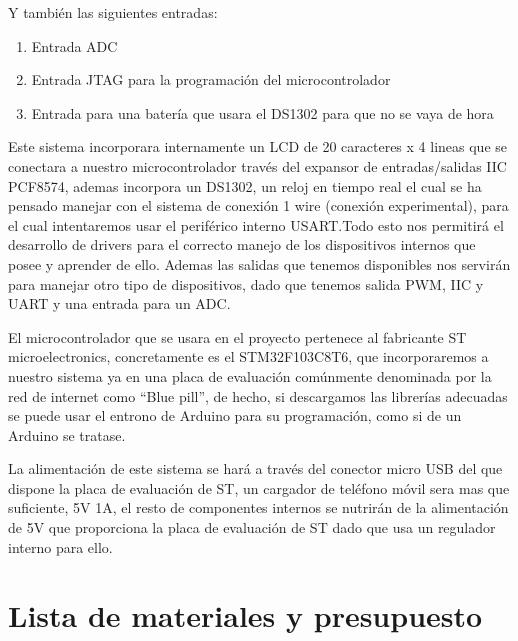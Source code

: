 \documentclass[10pt,a4paper,oneside]{article}
\begin{document}
Y también las siguientes entradas:

\begin{enumerate}
	\item Entrada ADC
	\item Entrada JTAG para la programación del microcontrolador
	\item Entrada para una batería que usara el DS1302 para que no se vaya de hora
\end{enumerate}

Este sistema incorporara internamente un LCD de 20 caracteres x 4 lineas que se conectara a nuestro microcontrolador través del expansor de entradas/salidas IIC PCF8574, ademas incorpora un DS1302, un reloj en tiempo real el cual se ha pensado manejar con el sistema de conexión 1 wire (conexión experimental), para el cual intentaremos usar el periférico interno USART.Todo esto nos permitirá el desarrollo de drivers para el correcto manejo de los dispositivos internos que posee y aprender de ello. Ademas las salidas que tenemos disponibles nos servirán para manejar otro tipo de dispositivos, dado que tenemos salida PWM, IIC y UART y una entrada para un ADC.

El microcontrolador que se usara en el proyecto pertenece al fabricante ST microelectronics, concretamente es el STM32F103C8T6, que incorporaremos a nuestro sistema ya en una placa de evaluación comúnmente denominada por la red de internet como "`Blue pill"', de hecho, si descargamos las librerías adecuadas se puede usar el entrono de Arduino para su programación, como si de un Arduino se tratase.

La alimentación de este sistema se hará a través del conector micro USB del que dispone la placa de evaluación de ST, un cargador de teléfono móvil sera mas que suficiente, 5V 1A, el resto de componentes internos se nutrirán de la alimentación de 5V que proporciona la placa de evaluación de ST dado que usa un regulador interno para ello.

\vspace{0.5cm}

\section{Lista de materiales y presupuesto}
\end{document}
